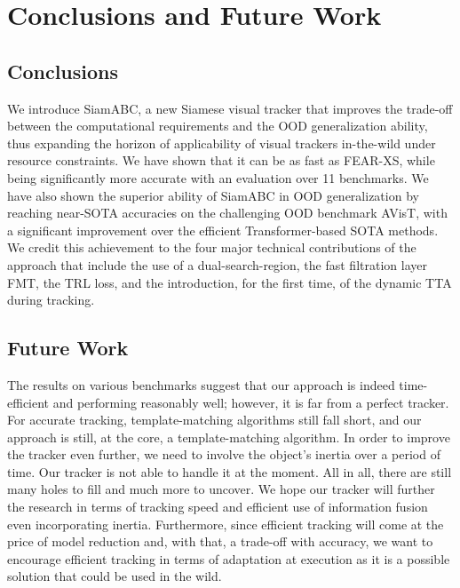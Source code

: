 
\chapter{Conclusions and Future Work} %

\label{Chapter6} %


\section{Conclusions}
We introduce SiamABC, a new Siamese visual tracker that improves the trade-off between the computational requirements and the OOD generalization ability, thus expanding the horizon of applicability of visual trackers in-the-wild under resource constraints. We have shown that it can be as fast as FEAR-XS, while being significantly more accurate with an evaluation over 11 benchmarks. We have also shown the superior ability of SiamABC in OOD generalization by reaching near-SOTA accuracies on the challenging OOD benchmark AVisT, with a significant improvement over the efficient Transformer-based SOTA methods. We credit this achievement to the four major technical contributions of the approach that include the use of a dual-search-region, the fast filtration layer FMT, the TRL loss, and the introduction, for the first time, of the dynamic TTA during tracking. 


\section{Future Work}
The results on various benchmarks suggest that our approach is indeed time-efficient and performing reasonably well; however, it is far from a perfect tracker. For accurate tracking, template-matching algorithms still fall short, and our approach is still, at the core, a template-matching algorithm. In order to improve the tracker even further, we need to involve the object's inertia over a period of time. Our tracker is not able to handle it at the moment. All in all, there are still many holes to fill and much more to uncover. We hope our tracker will further the research in terms of tracking speed and efficient use of information fusion even incorporating inertia. Furthermore, since efficient tracking will come at the price of model reduction and, with that, a trade-off with accuracy, we want to encourage efficient tracking in terms of adaptation at execution as it is a possible solution that could be used in the wild.

